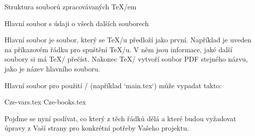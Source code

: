 

\sec Struktura souborů zpracovávaných \TeX/em

\secc[hlavni] Hlavní soubor s údaji o všech dalších souborech

Hlavní soubor je soubor, který se \TeX/u předloží jako první. Například je
uveden na příkazovém řádku pro spuštění \TeX/u. V něm jsou informace, jaké
další soubory si má \TeX/ přečíst. Nakonec \TeX/ vytvoří soubor PDF stejného
názvu, jako je název hlavního souboru.

Hlavní soubor pro použití \OpBible/ (například `main.tex`) může vypadat takto:

\begtt
\load[op-bible]  %
\cslang          %

\def\tmark     {BKR}    %

 {Cze-vars.tex}   %
 {Cze-books.tex}  %

\def\txsfile     {sources/Cze\tmark-\amark.txs}     %
\def\fmtfile     {formats/fmt-Cze\tmark-\amark.tex} %
\def\notesfile   {notes/notes-\amark.tex}           %
\def\introfile   {others/intro-\amark.tex}          %
\def\articlefile {others/articles-\amark.tex}       %

\def\printedbooks {%
   Gn Ex Lv Nu Dt Joz Sd Rt 1Sa 2Sa 1Kr 2Kr 1Pa 2Pa Ezd Neh
   Est Jb Ž Př Kaz Pís Iz Jr Pl Ez Da Oz Jl Am Abd Jon Mi
   Na Abk Sf Ag Za Mal 
   Mt Mk Lk Jn Sk Ř 1K 2K Ga Ef Fp Ko 1Te 2Te 1Tm 2Tm 
   Tt Fm Žd Jk 1Pt 2Pt 1Jn 2Jn 3Jn Ju Zj
}
\processbooks %
\bye
\endtt

Pojďme se nyní podívat, co který z těch řádků dělá a které budou vyžadovat úpravy z Vaší strany pro konkrétní  potřeby Vašeho projektu.

